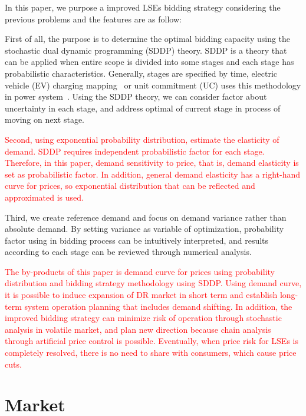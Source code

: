 \documentclass[journal]{IEEEtran} %
\begin{document}
In this paper, we purpose a improved LSEs bidding strategy considering the previous problems and the features are as follow: 

First of all, the purpose is to determine the optimal bidding capacity using the stochastic dual dynamic programming (SDDP) theory. SDDP is a theory that can be applied when entire scope is divided into some stages and each stage has probabilistic characteristics. Generally, stages are specified by time, electric vehicle (EV) charging mapping~\cite{fallah2020charge} or unit commitment (UC) uses this methodology in power system~\cite{zou2018multistage, hreinsson2019continuous}. Using the SDDP theory, we can consider factor about uncertainty in each stage, and address optimal of current stage in process of moving on next stage.

\textcolor{red}{Second, using exponential probability distribution, estimate the elasticity of demand. SDDP requires independent probabilistic factor for each stage. Therefore, in this paper, demand sensitivity to price, that is, demand elasticity is set as probabilistic factor. In addition, general demand elasticity has a right-hand curve for prices, so exponential distribution that can be reflected and approximated is used.}

Third, we create reference demand and focus on demand variance rather than absolute demand. By setting variance as variable of optimization, probability factor using in bidding process can be intuitively interpreted, and results according to each stage can be reviewed through numerical analysis.


\textcolor{red}{The by-products of this paper is demand curve for prices using probability distribution and bidding strategy methodology using SDDP. Using demand curve, it is possible to induce expansion of DR market in short term and establish long-term system operation planning that includes demand shifting. In addition, the improved bidding strategy can minimize risk of operation through stochastic analysis in volatile market, and plan new direction because chain analysis through artificial price control is possible. Eventually, when price risk for LSEs is completely resolved, there is no need to share with consumers, which cause price cuts.}

\section{Market}
\end{document}

